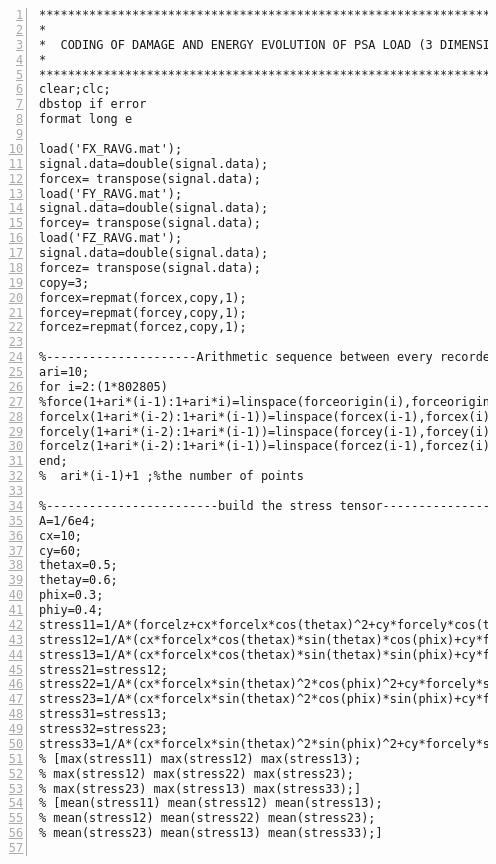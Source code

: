 \clearpage
\begin{lstlisting}[numbers=left, numberstyle=\tiny, keywordstyle=\color{blue!100}, commentstyle=\color{red!30!green!100!blue!100}, frame=shadowbox, rulesepcolor=\color{red!20!green!20!blue!20}]
***********************************************************************
*
*  CODING OF DAMAGE AND ENERGY EVOLUTION OF PSA LOAD (3 DIMENSIONAL)
*               
***********************************************************************
clear;clc;
dbstop if error
format long e

load('FX_RAVG.mat');
signal.data=double(signal.data);
forcex= transpose(signal.data);
load('FY_RAVG.mat');
signal.data=double(signal.data);
forcey= transpose(signal.data);
load('FZ_RAVG.mat');
signal.data=double(signal.data);
forcez= transpose(signal.data);
copy=3;
forcex=repmat(forcex,copy,1);
forcey=repmat(forcey,copy,1);
forcez=repmat(forcez,copy,1);

%---------------------Arithmetic sequence between every recorded points---------------------
ari=10; 
for i=2:(1*802805) 
%force(1+ari*(i-1):1+ari*i)=linspace(forceorigin(i),forceorigin(i+1),ari+1);
forcelx(1+ari*(i-2):1+ari*(i-1))=linspace(forcex(i-1),forcex(i),ari+1);
forcely(1+ari*(i-2):1+ari*(i-1))=linspace(forcey(i-1),forcey(i),ari+1);
forcelz(1+ari*(i-2):1+ari*(i-1))=linspace(forcez(i-1),forcez(i),ari+1);
end;
%  ari*(i-1)+1 ;%the number of points

%------------------------build the stress tensor---------------------
A=1/6e4;
cx=10;
cy=60;
thetax=0.5;
thetay=0.6;
phix=0.3;
phiy=0.4;
stress11=1/A*(forcelz+cx*forcelx*cos(thetax)^2+cy*forcely*cos(thetay)^2);
stress12=1/A*(cx*forcelx*cos(thetax)*sin(thetax)*cos(phix)+cy*forcely*cos(thetay)*sin(thetay)*cos(phiy));
stress13=1/A*(cx*forcelx*cos(thetax)*sin(thetax)*sin(phix)+cy*forcely*cos(thetay)*sin(thetay)*sin(phiy));
stress21=stress12;
stress22=1/A*(cx*forcelx*sin(thetax)^2*cos(phix)^2+cy*forcely*sin(thetay)^2*cos(phiy)^2);
stress23=1/A*(cx*forcelx*sin(thetax)^2*cos(phix)*sin(phix)+cy*forcely*sin(thetay)^2*cos(phiy)*sin(phiy));
stress31=stress13;
stress32=stress23;
stress33=1/A*(cx*forcelx*sin(thetax)^2*sin(phix)^2+cy*forcely*sin(thetay)^2*sin(phiy)^2);
% [max(stress11) max(stress12) max(stress13);
% max(stress12) max(stress22) max(stress23);
% max(stress23) max(stress13) max(stress33);]
% [mean(stress11) mean(stress12) mean(stress13);
% mean(stress12) mean(stress22) mean(stress23);
% mean(stress23) mean(stress13) mean(stress33);]


\end{lstlisting}

